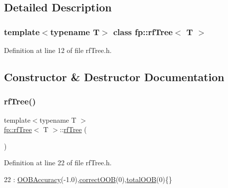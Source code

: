 \subsection{Detailed Description}
\subsubsection*{template$<$typename T$>$\newline
class fp\+::rf\+Tree$<$ T $>$}



Definition at line 12 of file rf\+Tree.\+h.



\subsection{Constructor \& Destructor Documentation}
\mbox{\label{classfp_1_1rfTree_aace007592f5b94dd9c045207354ea7a6}} 
\subsubsection{\texorpdfstring{rf\+Tree()}{rfTree()}\hspace{0.1cm}{\footnotesize\ttfamily [1/2]}}
{\footnotesize\ttfamily template$<$typename T $>$ \\
\hyperlink{classfp_1_1rfTree}{fp\+::rf\+Tree}$<$ T $>$\+::\hyperlink{classfp_1_1rfTree}{rf\+Tree} (\begin{DoxyParamCaption}{ }\end{DoxyParamCaption})\hspace{0.3cm}{\ttfamily [inline]}}



Definition at line 22 of file rf\+Tree.\+h.


\begin{DoxyCode}
22 : \hyperlink{classfp_1_1rfTree_a673f85d4df6f292a1819351c092a07e1}{OOBAccuracy}(-1.0),\hyperlink{classfp_1_1rfTree_a83832650bcea8d63cdcd480d9ddc6e6e}{correctOOB}(0),\hyperlink{classfp_1_1rfTree_aa200dc228adc20c12e514364d2b674df}{totalOOB}(0)\{\}
\end{DoxyCode}
\mbox{\label{classfp_1_1rfTree_aace007592f5b94dd9c045207354ea7a6}} 
